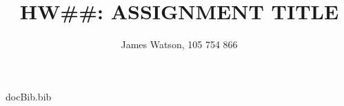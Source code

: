 \begin{filecontents}{docBib.bib}



\end{filecontents}

\documentclass{hw_grad}

% 








\title{HW\#\#: ASSIGNMENT TITLE}
\author{James Watson, 105 754 866}


\maketitle





